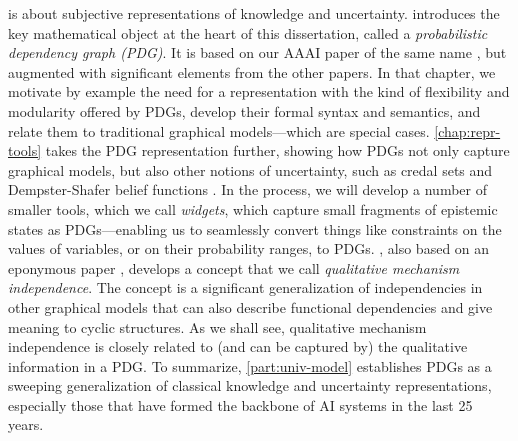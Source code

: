 \textbf{}
 is about subjective representations of knowledge and uncertainty. 
%
 introduces the key mathematical object at the heart of this dissertation, called a \emph{probabilistic dependency graph (PDG)}. 
It is based on our AAAI paper of the same name \citep{pdg-aaai}, but augmented with significant elements from the other papers. 
In that chapter, we motivate by example the need for a representation with the kind of flexibility and modularity offered by PDGs, develop their formal syntax and semantics, and relate them to traditional graphical models---which are special cases. 
%
\cref{chap:repr-tools} takes the PDG representation further, showing how PDGs not only capture graphical models, but also other notions of uncertainty, such as credal sets \citep{Walley1991-SRIP} and Dempster-Shafer belief functions \citep{shafer1976mathematical}.  
In the process, we will develop a number of smaller tools, which we call \emph{widgets}, which capture small fragments of epistemic states as PDGs---enabling us to seamlessly convert things like constraints on the values of variables, or on their probability ranges, to PDGs.
,
    also based on 
    an eponymous paper \citep*{qim},
    develops a concept that we call \emph{qualitative mechanism independence}.
The concept is a significant generalization of independencies in other graphical models that can also describe functional dependencies and give meaning to cyclic structures. 
As we shall see, qualitative mechanism independence is closely related to (and can be captured by) the qualitative information in a PDG.
%
To summarize, \cref{part:univ-model} establishes PDGs as a sweeping generalization of classical knowledge and uncertainty representations, especially those that have formed the backbone of AI systems in the last 25 years. 


